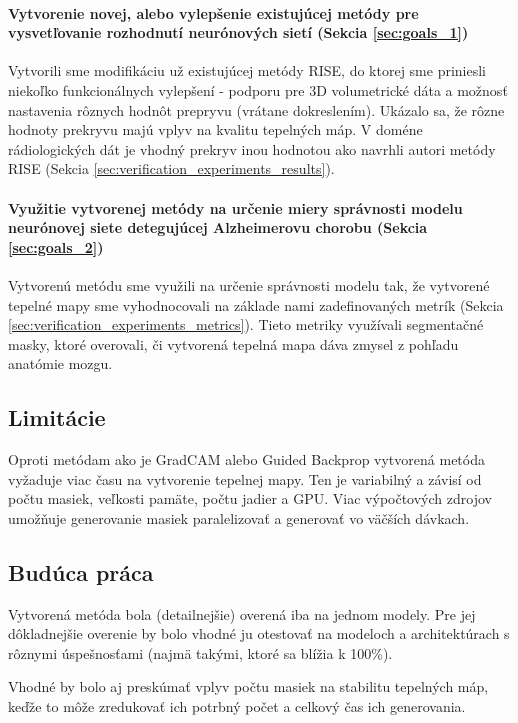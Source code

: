 \paragraph{Vytvorenie novej, alebo vylepšenie existujúcej metódy pre vysvetľovanie rozhodnutí neurónových sietí (Sekcia \ref{sec:goals_1})}

Vytvorili sme modifikáciu už existujúcej metódy RISE, do ktorej sme priniesli niekoľko funkcionálnych vylepšení - podporu pre 3D volumetrické dáta a možnosť nastavenia rôznych hodnôt prepryvu (vrátane dokreslením). Ukázalo sa, že rôzne hodnoty prekryvu majú vplyv na kvalitu tepelných máp. V doméne rádiologických dát je vhodný prekryv inou hodnotou ako navrhli autori metódy RISE (Sekcia \ref{sec:verification_experiments_results}).

\paragraph{Využitie vytvorenej metódy na určenie miery správnosti modelu neurónovej siete detegujúcej Alzheimerovu chorobu (Sekcia \ref{sec:goals_2})}

Vytvorenú metódu sme využili na určenie správnosti modelu tak, že vytvorené tepelné mapy sme vyhodnocovali na základe nami zadefinovaných metrík (Sekcia \ref{sec:verification_experiments_metrics}). Tieto metriky využívali segmentačné masky, ktoré overovali, či vytvorená tepelná mapa dáva zmysel z pohľadu anatómie mozgu.

\subsection{Limitácie}

Oproti metódam ako je GradCAM alebo Guided Backprop vytvorená metóda vyžaduje viac času na vytvorenie tepelnej mapy. Ten je variabilný a závisí od počtu masiek, veľkosti pamäte, počtu jadier a GPU. Viac výpočtových zdrojov umožňuje generovanie masiek paralelizovať a generovať vo väčších dávkach.

\subsection{Budúca práca}

Vytvorená metóda bola (detailnejšie) overená iba na jednom modely. Pre jej dôkladnejšie overenie by bolo vhodné ju otestovať na modeloch a architektúrach s rôznymi úspešnosťami (najmä takými, ktoré sa blížia k 100\%).

Vhodné by bolo aj preskúmať vplyv počtu masiek na stabilitu tepelných máp, keďže to môže zredukovať ich potrbný počet a celkový čas ich generovania. 
